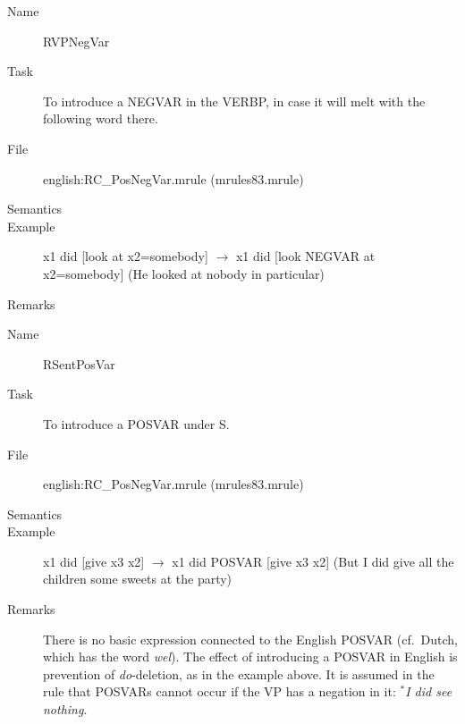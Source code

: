 \begin{description}
\vspace{1 cm}
\begin{description}
\item[Name] RVPNegVar
\item[Task] To introduce a NEGVAR in the VERBP, in case it will melt with the 
following word there.
\item[File] english:RC\_PosNegVar.mrule (mrules83.mrule)
\item[Semantics]
\item[Example] x1 did [look at x2=somebody] $\rightarrow$ x1 did [look NEGVAR 
at x2=somebody] (He looked at nobody in particular)
\item[Remarks]
\end{description}

\vspace{1 cm}
\begin{description}
\item[Name] RSentPosVar
\item[Task] To introduce a POSVAR under S.
\item[File] english:RC\_PosNegVar.mrule (mrules83.mrule)
\item[Semantics]
\item[Example] x1 did [give x3 x2] $\rightarrow$ x1 did POSVAR [give x3 x2] 
(But I did give all the children some sweets at the party)
\item[Remarks] There is no basic expression connected to the English POSVAR 
(cf.\ Dutch, which has the word {\em wel\/}). The effect of introducing a 
POSVAR in English is prevention of {\em do\/}-deletion, as in the example 
above. It is assumed in the rule that POSVARs cannot occur if the VP has a 
negation in it: $^{*}${\em I did see nothing\/}.
\end{description}

\end{description}

\newpage
